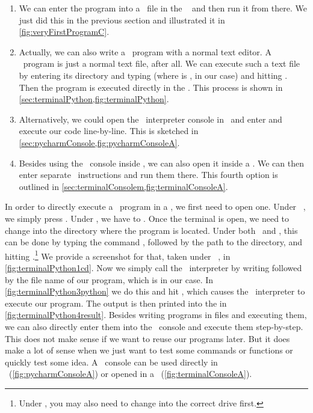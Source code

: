 \begin{enumerate}%
%
\item We can enter the program into a \python\ file in the \pycharm\  and then run it from there. %
We just did this in the previous section and illustrated it in \cref{fig:veryFirstProgramC}.%
%
\item Actually, we can also write a \python\ program with a normal text editor. %
A \python\ program is just a normal text file, after all. %
We can execute such a text file by entering its directory and typing  (where  is , in our case) and hitting \keys{\return}. %
Then the program is executed directly in the . %
This process is shown in \cref{sec:terminalPython,fig:terminalPython}.%
%
\item Alternatively, we could open the \python\ interpreter console in \pycharm\ and enter and execute our code line-by-line. %
This is sketched in \cref{sec:pycharmConsole,fig:pycharmConsoleA}.%
%
\item Besides using the \python\ console inside \pycharm, we can also open it inside a . %
We can then enter separate \python\ instructions and run them there. %
This fourth option is outlined in \cref{sec:terminalConsolem,fig:terminalConsoleA}.%
%
\end{enumerate}%
%
%
\label{sec:terminalPython}%
In order to directly execute a \python\ program in a , we first need to open one.
Under \ubuntu\ \linux, we simply press \ubuntuTerminal.
Under \microsoftWindows, we have to \windowsTerminal.
Once the terminal is open, we need to change into the directory where the program is located.
Under both \linux\ and \microsoftWindows, this can be done by typing the command , followed by the path to the directory, and hitting \keys{\return}.\footnote{%
Under \microsoftWindows, you may also need to change into the correct drive first.}
We provide a screenshot for that, taken under \ubuntu\ \linux, in \cref{fig:terminalPython1cd}.
Now we simply call the \python\ interpreter by writing  followed by the file name of our program, which is  in our case.
In \cref{fig:terminalPython3python} we do this and hit \keys{\return}, which causes the \python\ interpreter to execute our program.
The output  is then printed into the  in \cref{fig:terminalPython4result}.%
\endhsection%
%
%
\label{sec:pycharmConsole}%
Besides writing programs in files and executing them, we can also directly enter them into the \python\ console and execute them step-by-step.
This does not make sense if we want to reuse our programs later.
But it does make a lot of sense when we just want to test some commands or functions or quickly test some idea.
A \python\ console can be used directly in \pycharm~(\cref{fig:pycharmConsoleA}) or opened in a ~(\cref{fig:terminalConsoleA}).

